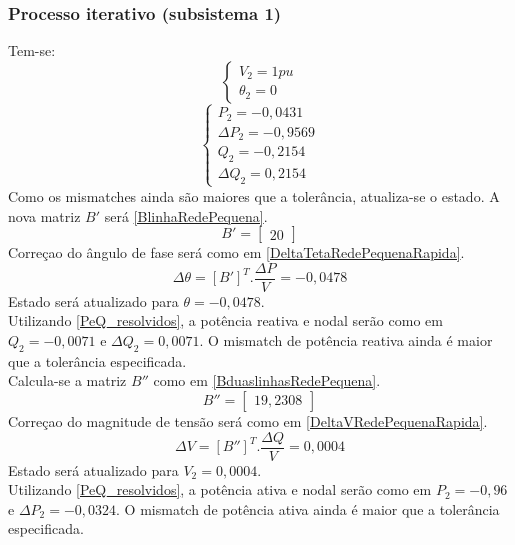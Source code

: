 \subsubsection{Processo iterativo (subsistema 1)}
Tem-se:
\begin{equation}
  \left\{    \begin{array}{llll}
                V_2=1pu\\
                \theta_2=0
    \end{array}\right.
\label{RedePequenaItera0a}
\end{equation}
\begin{equation}
    \left\{    \begin{array}{llll}
                P_2= -0,0431\\
                \Delta P_2 = -0,9569\\
                Q_2 = -0,2154\\
                \Delta Q_2 = 0,2154
            \end{array}\right.
    \label{RedePequenaItera0b}
\end{equation}
Como os mismatches ainda são maiores que a tolerância, atualiza-se o estado. A nova matriz $B'$ será \ref{BlinhaRedePequena}.
\begin{equation}
            B'  = \left[ \begin{matrix} 20  \end{matrix} \right] 
            \label{BlinhaRedePequena}
\end{equation}
Correçao do ângulo de fase será como em \ref{DeltaTetaRedePequenaRapida}.
\begin{equation}
            \Delta \theta = [B']^T . \frac{\Delta P}{V} = -0,0478
            \label{DeltaTetaRedePequenaRapida}
\end{equation}
Estado será atualizado para $\theta = -0,0478$.\\
Utilizando \ref{PeQ_resolvidos}, a potência reativa e nodal serão como em $Q_2 = -0,0071$ e $\Delta Q_2 = 0,0071$. O mismatch de potência reativa ainda é maior que a tolerância especificada.\\
Calcula-se a matriz $B''$ como em \ref{BduaslinhasRedePequena}. 
\begin{equation}
            B''  = \left[ \begin{matrix} 19,2308  \end{matrix} \right] 
            \label{BduaslinhasRedePequena}
\end{equation}
Correçao do magnitude de tensão será como em \ref{DeltaVRedePequenaRapida}.
\begin{equation}
            \Delta V = [B'']^T . \frac{\Delta Q}{V} = 0,0004
            \label{DeltaVRedePequenaRapida}
\end{equation}
Estado será atualizado para $V_2 = 0,0004$.\\
Utilizando \ref{PeQ_resolvidos}, a potência ativa e nodal serão como em $P_2 = -0,96$ e $\Delta P_2 = -0,0324$. O mismatch de potência ativa ainda é maior que a tolerância especificada.
